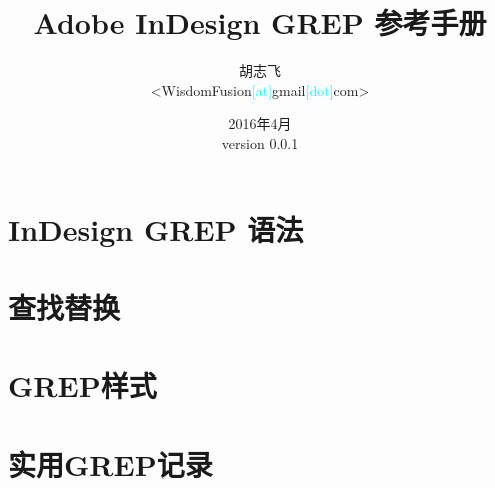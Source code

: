 \documentclass[12pt,a4paper]{ctexart}
\begin{document}
\title{\textbf{Adobe InDesign GREP 参考手册}}
\author{胡志飞\\<WisdomFusion\textcolor{cyan}{\small [at]}gmail\textcolor{cyan}{\small [dot]}com>}
\date{\color{OrangeRed}2016年4月\\version 0.0.1}

\maketitle{}
\thispagestyle{empty}
\clearpage{}

\tableofcontents

\clearpage{}

\setcounter{page}{1}

\section{InDesign GREP 语法}
\label{sec:indesign-grep-syntax}


\section{查找替换}
\label{sec:search-replace}

\section{GREP样式}
\label{sec:grep-style}

\section{实用GREP记录}
\label{sec:grep-examples}
\end{document}
